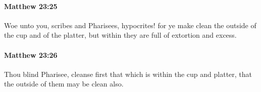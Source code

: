 		\paragraph{Matthew 23:25} %
			\label{MATTHEW-23-25}

			Woe unto you, scribes and Pharisees, hypocrites! for ye make clean the outside of the cup and of the platter, but within they are full of extortion and excess.

			\begin{framed}
			\scriptsize
				\begin{compactdesc}
					\item[SBLG] 
				\end{compactdesc}
			\end{framed}

		\paragraph{Matthew 23:26} %
			\label{MATTHEW-23-26}

			Thou blind Pharisee, cleanse first that which is within the cup and platter, that the outside of them may be clean also.

